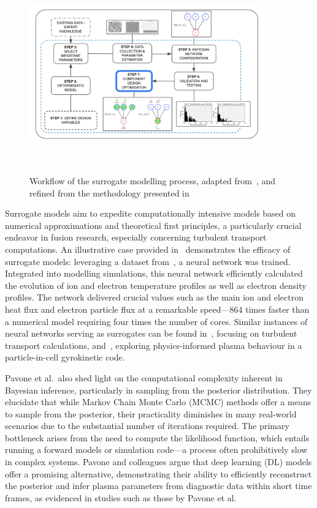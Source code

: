 \documentclass[journal]{IEEEtran}
\begin{document}
\begin{figure}[t]
    \centering
    \includegraphics[width=0.9\textwidth]{figures/methodology/workflows/workflow_v5.png}
    \caption{Workflow of the surrogate modelling process, adapted from~\cite{Conti2019}, and refined from the methodology presented in~\cite{Griffiths2024}}~\label{fig:workflow}
\end{figure}

Surrogate models aim to expedite computationally intensive models based on numerical approximations and theoretical first principles, a particularly crucial endeavor in fusion research, especially concerning turbulent transport computations. An illustrative case provided in~\cite{Van2020} demonstrates the efficacy of surrogate models: leveraging a dataset from~\cite{Citrin2017}, a neural network was trained. Integrated into modelling simulations, this neural network efficiently calculated the evolution of ion and electron temperature profiles as well as electron density profiles. The network delivered crucial values such as the main ion and electron heat flux and electron particle flux at a remarkable speed—864 times faster than a numerical model requiring four times the number of cores. Similar instances of neural networks serving as surrogates can be found in~\cite{Meneghini2017}, focusing on turbulent transport calculations, and~\cite{Miller2021}, exploring physics-informed plasma behaviour in a particle-in-cell gyrokinetic code.

Pavone et al.\ also shed light on the computational complexity inherent in Bayesian inference, particularly in sampling from the posterior distribution. They elucidate that while Markov Chain Monte Carlo (MCMC) methods offer a means to sample from the posterior, their practicality diminishes in many real-world scenarios due to the substantial number of iterations required. The primary bottleneck arises from the need to compute the likelihood function, which entails running a forward models or simulation code—a process often prohibitively slow in complex systems. Pavone and colleagues argue that deep learning (DL) models offer a promising alternative, demonstrating their ability to efficiently reconstruct the posterior and infer plasma parameters from diagnostic data within short time frames, as evidenced in studies such as those by Pavone et al.~\cite{Pavone2018,Pavone2019, Pavone2020, Pavone2021}
\end{document}
